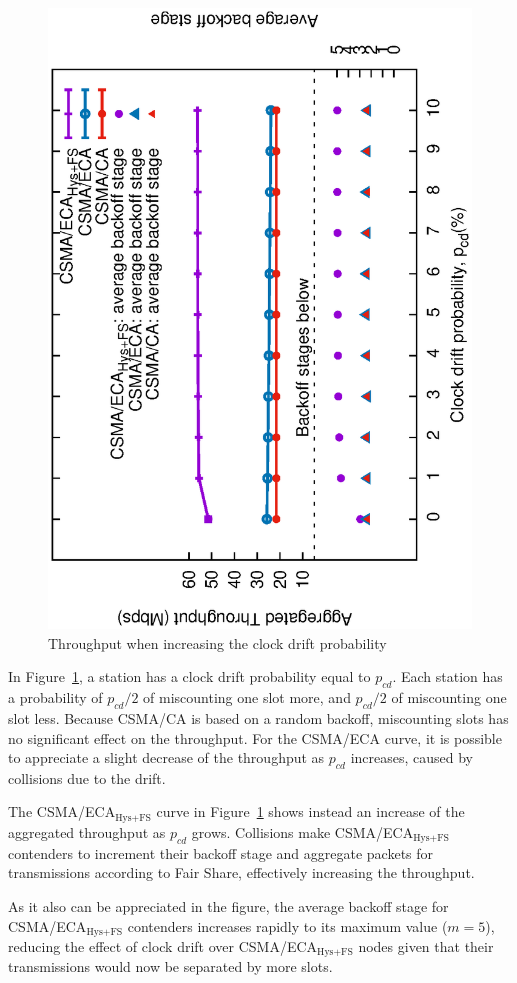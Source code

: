 	\begin{figure}[tb]
	\centering
		\includegraphics[width=0.7\linewidth,angle=-90]{figures/clockDrift/throughput_and_BOS_w_SD-TON.eps}
		\caption{Throughput when increasing the clock drift probability}
		\label{fig:clockDrift}
	\end{figure}
	
	In Figure~\ref{fig:clockDrift}, a station has a clock drift probability equal to $p_{cd}$. Each station has a probability of $p_{cd}/2$ of miscounting one slot more, and $p_{cd}/2$ of miscounting one slot less. Because CSMA/CA is based on a random backoff, miscounting slots has no significant effect on the throughput. For the CSMA/ECA curve, it is possible to appreciate a slight decrease of the throughput as $p_{cd}$ increases, caused by collisions due to the drift.
	
	The CSMA/ECA$_{\text{Hys+FS}}$ curve in Figure~\ref{fig:clockDrift} shows instead an increase of the aggregated throughput as $p_{cd}$ grows. Collisions make CSMA/ECA$_{\text{Hys+FS}}$ contenders to increment their backoff stage and aggregate packets for transmissions according to Fair Share, effectively increasing the throughput. 
	
	As it also can be appreciated in the figure, the average backoff stage for CSMA/ECA$_{\text{Hys+FS}}$ contenders increases rapidly to its maximum value ($m=5$), reducing the effect of clock drift over CSMA/ECA$_{\text{Hys+FS}}$ nodes given that their transmissions would now be separated by more slots.\\
	

